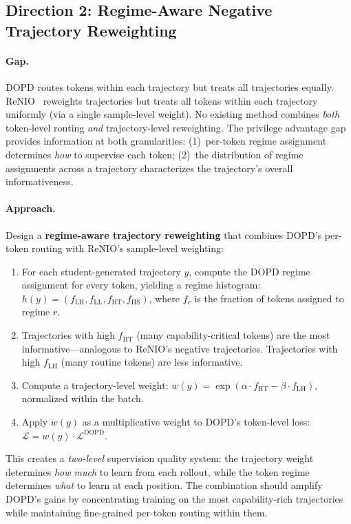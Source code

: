 \documentclass[11pt,a4paper]{article}
\begin{document}
\subsection{Direction 2: Regime-Aware Negative Trajectory Reweighting}

\paragraph{Gap.} DOPD routes tokens within each trajectory but treats all trajectories equally. ReNIO~\cite{lin2026renio} reweights trajectories but treats all tokens within each trajectory uniformly (via a single sample-level weight). No existing method combines \emph{both} token-level routing \emph{and} trajectory-level reweighting. The privilege advantage gap provides information at both granularities: (1)~per-token regime assignment determines \emph{how} to supervise each token; (2)~the distribution of regime assignments across a trajectory characterizes the trajectory's overall informativeness.

\paragraph{Approach.} Design a \textbf{regime-aware trajectory reweighting} that combines DOPD's per-token routing with ReNIO's sample-level weighting:
\begin{enumerate}
\item For each student-generated trajectory $y$, compute the DOPD regime assignment for every token, yielding a regime histogram: $h(y) = (f_{\mathrm{LH}}, f_{\mathrm{LL}}, f_{\mathrm{HT}}, f_{\mathrm{HS}})$, where $f_r$ is the fraction of tokens assigned to regime $r$.
\item Trajectories with high $f_{\mathrm{HT}}$ (many capability-critical tokens) are the most informative---analogous to ReNIO's negative trajectories. Trajectories with high $f_{\mathrm{LH}}$ (many routine tokens) are less informative.
\item Compute a trajectory-level weight: $w(y) = \exp(\alpha \cdot f_{\mathrm{HT}} - \beta \cdot f_{\mathrm{LH}})$, normalized within the batch.
\item Apply $w(y)$ as a multiplicative weight to DOPD's token-level loss: $\mathcal{L} = w(y) \cdot \mathcal{L}^{\mathrm{DOPD}}$.
\end{enumerate}
This creates a \emph{two-level} supervision quality system: the trajectory weight determines \emph{how much} to learn from each rollout, while the token regime determines \emph{what} to learn at each position. The combination should amplify DOPD's gains by concentrating training on the most capability-rich trajectories while maintaining fine-grained per-token routing within them.
\end{document}
